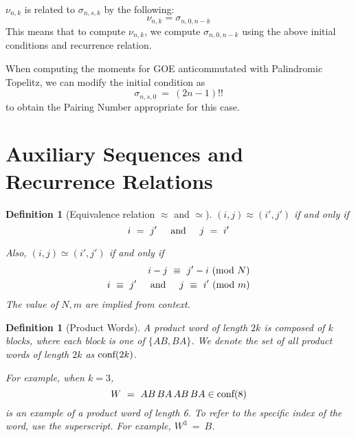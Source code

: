 \documentclass[12pt,reqno]{amsart}
\theoremstyle{plain} %
\newtheorem{definition}[theorem]{Definition}
\theoremstyle{remark}
\theoremstyle{definition}
\renewcommand{\mod}[1]{\textup{ (mod~$#1$)}}
\begin{document}
\begin{remark}[Relation to \(\nu_{n, k}\)]
\(\nu_{n, k}\) is related to \(\sigma_{n, s, k}\) by the following:
\[
\nu_{n, k} = \sigma_{n, 0, n - k}
\]
This means that to compute \(\nu_{n, k}\), we compute \(\sigma_{n, 0, n - k}\) 
using the above initial conditions and recurrence relation. 
\end{remark}

\begin{remark}
    When computing the moments for GOE anticommutated 
    with Palindromic Topelitz, we can modify the initial condition as 
    \[
        \sigma_{n, s, 0} \ = \ (2n - 1)!!
    \]
    to obtain the Pairing Number appropriate for this case. 
\end{remark}


\section{Auxiliary Sequences and Recurrence Relations}


\begin{definition} [Equivalence relation $\approx$ and $\simeq$]

    $(i, j) \approx (i', j')$ if and only if 
    \begin{equation}
        i \ = \ j' \textAnd j \ = \ i'
    \end{equation}

    Also, 
$(i, j) \simeq (i', j')$ if and only if 
    \begin{eqnarray}
        i - j \ \equiv \ j' - i \mod N 
    \\
       i \ \equiv \ j' \textAnd j \ \equiv \ i' \mod m
    \end{eqnarray}
    The value of $N, m$ are implied from context. 
\end{definition}

\begin{definition}[Product Words]
A \textit{product word} of length \(2k\) is composed of \(k\) blocks, where each block is one of \(\{AB, BA\}\). 
We denote the set of all product words of length $2k$ as 
$\textnormal{conf}(2k)$.


For example, when \(k = 3\),
\[
W \ = \ AB \, BA \, AB \, BA \in \textnormal{conf}(8)
\]
is an example of a product word of length 6. To 
refer to the specific index of the word, use the superscript. 
For example, $W^3 \ =\ B$. 

\end{definition}
\end{document}

